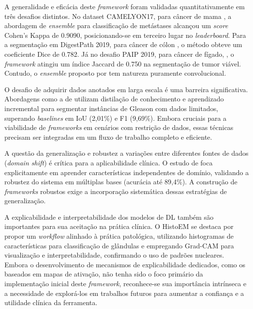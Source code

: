 A generalidade e eficácia deste \textit{framework} foram validadas quantitativamente em três desafios distintos. No dataset CAMELYON17, para câncer de mama \cite{bandi2019detection}, a abordagem de \textit{ensemble} para classificação de metástases alcançou um \textit{score} Cohen's Kappa de 0.9090, posicionando-se em terceiro lugar no \textit{leaderboard}.
Para a segmentação em DigestPath 2019, para câncer de cólon \cite{DA2022102485}, o método obteve um coeficiente Dice de 0.782.
Já no desafio PAIP 2019, para câncer de fígado, \cite{KIM2021101854}, o \textit{framework} atingiu um índice Jaccard de 0.750 na segmentação de tumor viável.
Contudo, o \textit{ensemble} proposto por \textcite{Khened2021} tem natureza puramente convolucional.

O desafio de adquirir dados anotados em larga escala é uma barreira significativa. Abordagens como a de \cite{Hassan2022}
utilizam distilação de conhecimento e aprendizado incremental para segmentar instâncias de Gleason com dados limitados, superando \textit{baselines} em IoU (2,01\%) e F1 (9,69\%). Embora cruciais para a viabilidade de \textit{frameworks} em cenários com restrição de dados, essas técnicas precisam ser integradas em um fluxo de trabalho completo e eficiente.

A questão da generalização e robustez a variações entre diferentes fontes de dados (\textit{domain shift}) é crítica para a aplicabilidade clínica. O estudo de \cite{Bulten2022}
foca explicitamente em aprender características independentes de domínio, validando a robustez do sistema em múltiplas bases (acurácia até 89,4\%). A construção de \textit{frameworks} robustos exige a incorporação sistemática dessas estratégias de generalização.

A explicabilidade e interpretabilidade dos modelos de DL também são importantes para sua aceitação na prática clínica. O HistoEM \cite{Ferrero2024}
se destaca por propor um \textit{workflow} alinhado à prática patológica, utilizando histogramas de características para classificação de glândulas e empregando Grad-CAM \cite{Selvaraju2017GradCAM} para visualização e interpretabilidade, confirmando o uso de padrões nucleares. Embora o desenvolvimento de mecanismos de explicabilidade dedicados, como os baseados em mapas de ativação, não tenha sido o foco primário da implementação inicial deste \textit{framework}, reconhece-se sua importância intrínseca e a necessidade de explorá-los em trabalhos futuros para aumentar a confiança e a utilidade clínica da ferramenta.

